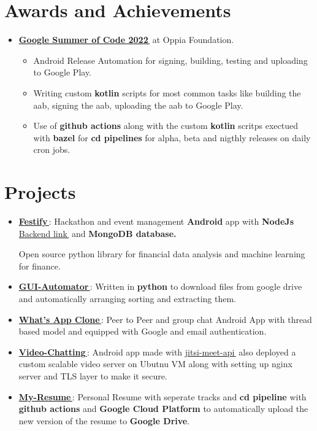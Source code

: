 \documentclass[letterpaper,11pt]{article}
\let\orighref\href
\renewcommand{\href}[2]{\orighref{#1}{#2\,\faExternalLink}}
\newcommand{\resumeItem}[2]{
  \item\small{
    \textbf{#1}{: #2 \vspace{-2pt}}
  }
}
\newcommand{\resumeSubHeadingListStart}{\begin{itemize}[leftmargin=*]}
\newcommand{\resumeSubHeadingListEnd}{\end{itemize}}
\begin{document}
\section{Awards and Achievements}
\begin{itemize}
	\item \textbf{\href{https://summerofcode.withgoogle.com/programs/2022/projects/zGrrUdxM}{Google Summer of Code 2022}} {at Oppia Foundation.}
	      \begin{itemize}
		      \item Android Release Automation for signing, building, testing and uploading to Google Play.
		      \item Writing custom \textbf{kotlin} scripts for most common tasks like building the aab, signing the aab, uploading the aab to Google Play.
		      \item Use of \textbf{github actions} along with the custom \textbf{kotlin} scritps exectued with \textbf{bazel} for \textbf{cd pipelines} for alpha, beta and nigthly releases on daily cron jobs.
	      \end{itemize}
\end{itemize}

\section{Projects}
\resumeSubHeadingListStart
\resumeItem{\href{https://github.com/yash10019coder/festify-android}{Festify}}{Hackathon and event management \textbf{Android} app with \textbf{NodeJs} \href{https://github.com/yash10019coder/festify-node-server}{Backend link} and \textbf{MongoDB database.}}
{Open source python library for financial data analysis and machine learning for finance.}
\resumeItem{\href{https://github.com/yash10019coder/Gui-Automator}{GUI-Automator}}
{Written in \textbf{python} to download files from google drive and automatically arranging sorting and extracting them.}
\resumeItem{\href{https://github.com/yash10019coder/Whats-App}{What's App Clone}}
{Peer to Peer and group chat Android App with thread based model and equipped with Google and email authentication.}
\resumeItem{\href{https://github.com/yash10019coder/Video-Chatting}{Video-Chatting}}
{Android app made with \href{https://github.com/jitsi/jitsi-meet}{jitsi-meet-api} also deployed a custom scalable video server on Ubutnu VM along with setting up nginx server and TLS layer to make it secure.}
\resumeItem{\href{https://github.com/yash10019coder/resume}{My-Resume}}{Personal Resume with seperate tracks and \textbf{cd pipeline} with \textbf{github actions} and \textbf{Google Cloud Platform} to automatically upload the new version of the resume to \textbf{Google Drive}.}
\resumeSubHeadingListEnd
\end{document}
